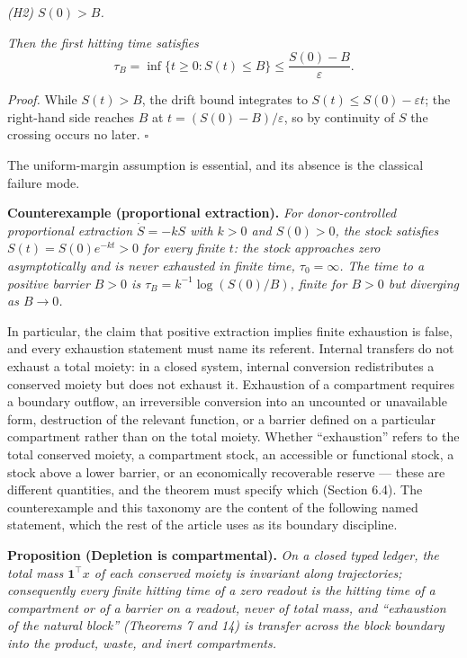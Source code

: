 \documentclass[11pt]{article}
\begin{document}
\emph{(H2) \(S(0) > B\).}

\emph{Then the first hitting time satisfies}
\[\tau_B = \inf\{ t \ge 0 : S(t) \le B \} \le \frac{S(0) - B}{\varepsilon}.\]

\emph{Proof.} While \(S(t) > B\), the drift bound integrates to
\(S(t) \le S(0) - \varepsilon t\); the right-hand side reaches \(B\) at
\(t = (S(0) - B)/\varepsilon\), so by continuity of \(S\) the crossing
occurs no later. \ensuremath{\square}

The uniform-margin assumption is essential, and its absence is the
classical failure mode.

\textbf{Counterexample (proportional extraction).} \emph{For
donor-controlled proportional extraction \(\dot S = -kS\) with \(k > 0\)
and \(S(0) > 0\), the stock satisfies \(S(t) = S(0)e^{-kt} > 0\) for
every finite \(t\): the stock approaches zero asymptotically and is
never exhausted in finite time, \(\tau_0 = \infty\). The time to a
positive barrier \(B > 0\) is \(\tau_B = k^{-1}\log(S(0)/B)\), finite
for \(B > 0\) but diverging as \(B \to 0\).}

In particular, the claim that positive extraction implies finite
exhaustion is false, and every exhaustion statement must name its
referent. Internal transfers do not exhaust a total moiety: in a closed
system, internal conversion redistributes a conserved moiety but does
not exhaust it. Exhaustion of a compartment requires a boundary outflow,
an irreversible conversion into an uncounted or unavailable form,
destruction of the relevant function, or a barrier defined on a
particular compartment rather than on the total moiety. Whether
``exhaustion'' refers to the total conserved moiety, a compartment
stock, an accessible or functional stock, a stock above a lower barrier,
or an economically recoverable reserve --- these are different
quantities, and the theorem must specify which (Section 6.4). The
counterexample and this taxonomy are the content of the following named
statement, which the rest of the article uses as its boundary
discipline.

\textbf{Proposition (Depletion is compartmental).} \emph{On a closed
typed ledger, the total mass \(\mathbf{1}^\top x\) of each conserved
moiety is invariant along trajectories; consequently every finite
hitting time of a zero readout is the hitting time of a compartment or
of a barrier on a readout, never of total mass, and ``exhaustion of the
natural block'' (Theorems 7 and 14) is transfer across the block
boundary into the product, waste, and inert compartments.}
\end{document}
